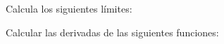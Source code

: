 \documentclass[addpoints,spanish, 12pt,a4paper]{exam}
\begin{document}
\begin{questions}

\question Calcula los siguientes límites:


\question Calcular las derivadas de las siguientes funciones: 
\begin{parts}

\end{parts}
\end{questions}
\end{document}
